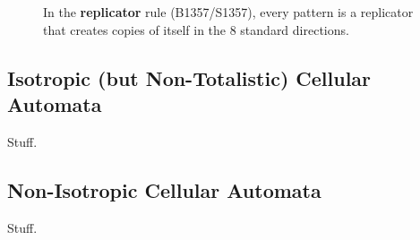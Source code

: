 \begin{figure}[!htb]
	\centering
	\caption{In the \textbf{replicator} rule (B1357/S1357), every pattern is a replicator that creates copies of itself in the $8$ standard directions.}\label{fig:replicator_smile}
\end{figure}




\subsection{Isotropic (but Non-Totalistic) Cellular Automata}\label{sec:isotropic_rules}

Stuff.


\subsection{Non-Isotropic Cellular Automata}\label{sec:non_isotropic_rules}

Stuff.


